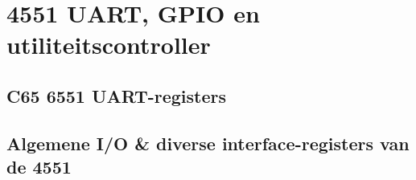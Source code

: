 \chapter{4551 UART, GPIO en utiliteitscontroller}

\section{C65 6551 UART-registers}



\section{Algemene I/O \& diverse interface-registers van de 4551}
\label{sec:uartmisc}


